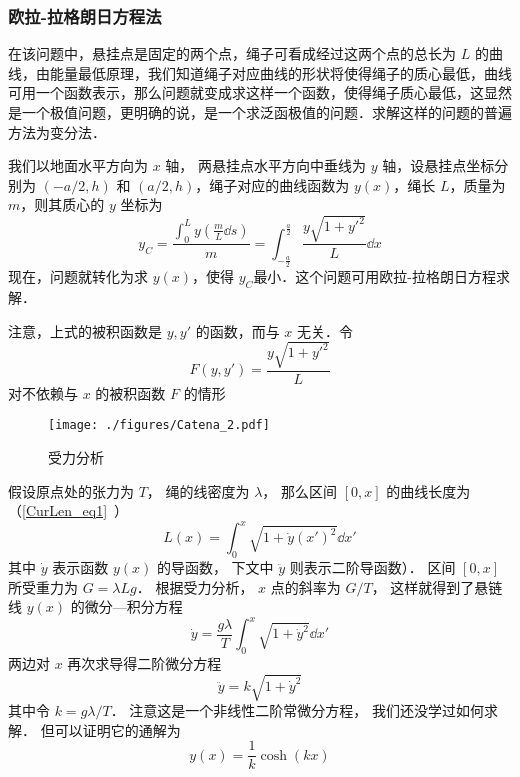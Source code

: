 \subsubsection{欧拉-拉格朗日方程法}
在该问题中，悬挂点是固定的两个点，绳子可看成经过这两个点的总长为 $L$ 的曲线，由能量最低原理，我们知道绳子对应曲线的形状将使得绳子的质心最低，曲线可用一个函数表示，那么问题就变成求这样一个函数，使得绳子质心最低，这显然是一个极值问题，更明确的说，是一个求泛函极值的问题．求解这样的问题的普遍方法为变分法．

我们以地面水平方向为 $x$ 轴， 两悬挂点水平方向中垂线为 $y$ 轴，设悬挂点坐标分别为 $(-a/2,h)$ 和 $(a/2,h)$，绳子对应的曲线函数为 $y(x)$，绳长 $L$，质量为 $m$，则其质心的 $y$ 坐标为
\begin{equation}
y_C=\frac{\int_{0}^{L}y(\frac{m}{L}\dd s)}{m}=\int_{-\frac{a}{2}}^{\frac{a}{2}} \frac{y\sqrt{1+y'^2}}{L}\dd x
\end{equation}
现在，问题就转化为求 $y(x)$，使得 $y_C$最小．这个问题可用欧拉-拉格朗日方程求解．

注意，上式的被积函数是 $y,y'$ 的函数，而与 $x$ 无关．令 
\begin{equation}
F(y,y')=\frac{y\sqrt{1+y'^2}}{L}
\end{equation}
对不依赖与 $x$ 的被积函数 $F$ 的情形
\begin{figure}[ht]
\centering
\texttt{[image: ./figures/Catena\_2.pdf]}
\caption{受力分析} \label{Catena_fig2}
\end{figure}
假设原点处的张力为 $T$， 绳的线密度为 $\lambda$， 那么区间 $[0, x]$ 的曲线长度为（\autoref{CurLen_eq1}~）
\begin{equation}\label{Catena_eq1}
L(x) = \int_0^x \sqrt{1 + \dot y(x')^2} \dd{x'}
\end{equation}
其中 $\dot y$ 表示函数 $y(x)$ 的导函数， 下文中 $\ddot y$ 则表示二阶导函数）． 区间 $[0, x]$ 所受重力为 $G = \lambda L g$． 根据受力分析， $x$ 点的斜率为 $G/T$， 这样就得到了悬链线 $y(x)$ 的微分—积分方程
\begin{equation}
\dot y = \frac{g\lambda}{T} \int_0^x \sqrt{1 + \dot y^2} \dd{x'}
\end{equation}
两边对 $x$ 再次求导得二阶微分方程
\begin{equation}
\ddot y = k \sqrt{1 + \dot y^2}
\end{equation}
其中令 $k = g\lambda/T$． 注意这是一个非线性二阶常微分方程， 我们还没学过如何求解． 但可以证明它的通解为
\begin{equation}\label{Catena_eq2}
y(x) = \frac{1}{k}\cosh(kx)
\end{equation}

